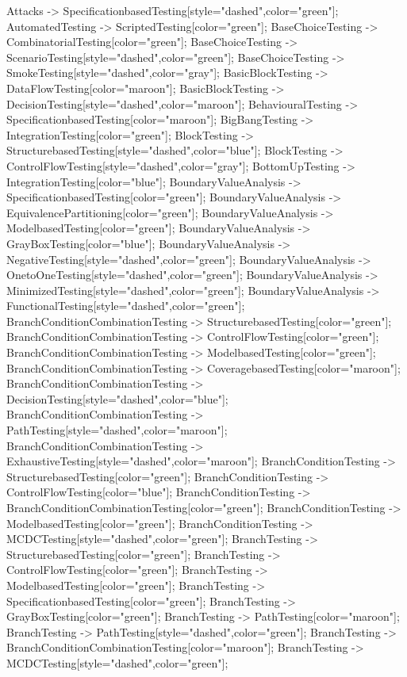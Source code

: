 \documentclass{article}
\begin{document}
{Attacks -> SpecificationbasedTesting[style="dashed",color="green"];
AutomatedTesting -> ScriptedTesting[color="green"];
BaseChoiceTesting -> CombinatorialTesting[color="green"];
BaseChoiceTesting -> ScenarioTesting[style="dashed",color="green"];
BaseChoiceTesting -> SmokeTesting[style="dashed",color="gray"];
BasicBlockTesting -> DataFlowTesting[color="maroon"];
BasicBlockTesting -> DecisionTesting[style="dashed",color="maroon"];
BehaviouralTesting -> SpecificationbasedTesting[color="maroon"];
BigBangTesting -> IntegrationTesting[color="green"];
BlockTesting -> StructurebasedTesting[style="dashed",color="blue"];
BlockTesting -> ControlFlowTesting[style="dashed",color="gray"];
BottomUpTesting -> IntegrationTesting[color="blue"];
BoundaryValueAnalysis -> SpecificationbasedTesting[color="green"];
BoundaryValueAnalysis -> EquivalencePartitioning[color="green"];
BoundaryValueAnalysis -> ModelbasedTesting[color="green"];
BoundaryValueAnalysis -> GrayBoxTesting[color="blue"];
BoundaryValueAnalysis -> NegativeTesting[style="dashed",color="green"];
BoundaryValueAnalysis -> OnetoOneTesting[style="dashed",color="green"];
BoundaryValueAnalysis -> MinimizedTesting[style="dashed",color="green"];
BoundaryValueAnalysis -> FunctionalTesting[style="dashed",color="green"];
BranchConditionCombinationTesting -> StructurebasedTesting[color="green"];
BranchConditionCombinationTesting -> ControlFlowTesting[color="green"];
BranchConditionCombinationTesting -> ModelbasedTesting[color="green"];
BranchConditionCombinationTesting -> CoveragebasedTesting[color="maroon"];
BranchConditionCombinationTesting -> DecisionTesting[style="dashed",color="blue"];
BranchConditionCombinationTesting -> PathTesting[style="dashed",color="maroon"];
BranchConditionCombinationTesting -> ExhaustiveTesting[style="dashed",color="maroon"];
BranchConditionTesting -> StructurebasedTesting[color="green"];
BranchConditionTesting -> ControlFlowTesting[color="blue"];
BranchConditionTesting -> BranchConditionCombinationTesting[color="green"];
BranchConditionTesting -> ModelbasedTesting[color="green"];
BranchConditionTesting -> MCDCTesting[style="dashed",color="green"];
BranchTesting -> StructurebasedTesting[color="green"];
BranchTesting -> ControlFlowTesting[color="green"];
BranchTesting -> ModelbasedTesting[color="green"];
BranchTesting -> SpecificationbasedTesting[color="green"];
BranchTesting -> GrayBoxTesting[color="green"];
BranchTesting -> PathTesting[color="maroon"];
BranchTesting -> PathTesting[style="dashed",color="green"];
BranchTesting -> BranchConditionCombinationTesting[color="maroon"];
BranchTesting -> MCDCTesting[style="dashed",color="green"];
}
\end{document}
